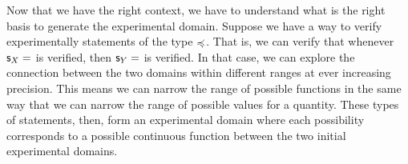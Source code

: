 \documentclass[11pt,letterpaper,fleqn]{memoir} %
\begin{document}
Now that we have the right context, we have to understand what is the right basis to generate the experimental domain. Suppose we have a way to verify experimentally statements of the type $\preccurlyeq$. That is, we can verify that whenever $\mathsf{s}_X=$ is verified, then $\mathsf{s}_Y=$ is verified. In that case, we can explore the connection between the two domains within different ranges at ever increasing precision. This means we can narrow the range of possible functions in the same way that we can narrow the range of possible values for a quantity. These types of statements, then, form an experimental domain where each possibility corresponds to a possible continuous function between the two initial experimental domains.
\end{document}
